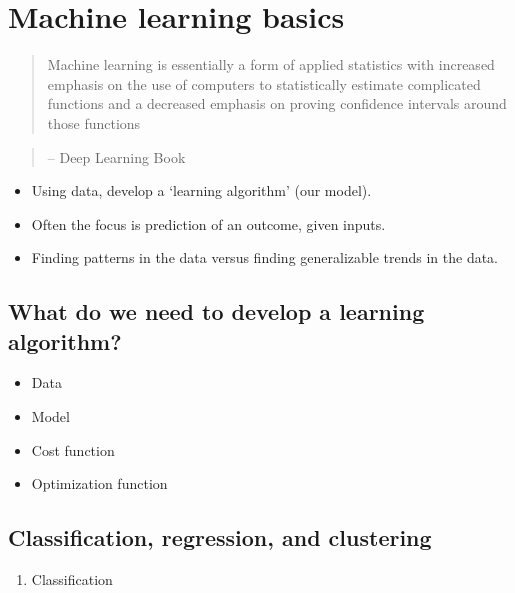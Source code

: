\documentclass[fontset=fandol,zihao=false,scheme=chinese,heading=true,UTF8]{ctexbook}
\providecommand{\tightlist}{%
  \setlength{\itemsep}{0pt}\setlength{\parskip}{0pt}}
\begin{document}
\hypertarget{machine-learning-basics}{%
\chapter{Machine learning basics}\label{machine-learning-basics}}

\begin{quote}
Machine learning is essentially a form of applied statistics with increased emphasis on the use of computers to statistically estimate complicated functions and a decreased emphasis on proving confidence intervals around those functions
\end{quote}

\begin{quote}
-- Deep Learning Book
\end{quote}

\begin{itemize}
\tightlist
\item
  Using data, develop a `learning algorithm' (our model).
\item
  Often the focus is prediction of an outcome, given inputs.
\item
  Finding patterns in the data versus finding generalizable trends in the data.
\end{itemize}

\hypertarget{what-do-we-need-to-develop-a-learning-algorithm}{%
\section{What do we need to develop a learning algorithm?}\label{what-do-we-need-to-develop-a-learning-algorithm}}

\begin{itemize}
\tightlist
\item
  Data
\item
  Model
\item
  Cost function
\item
  Optimization function
\end{itemize}

\hypertarget{classification-regression-and-clustering}{%
\section{Classification, regression, and clustering}\label{classification-regression-and-clustering}}

\begin{enumerate}
\def\labelenumi{\arabic{enumi}.}
\tightlist
\item
  Classification
\end{enumerate}
\end{document}
